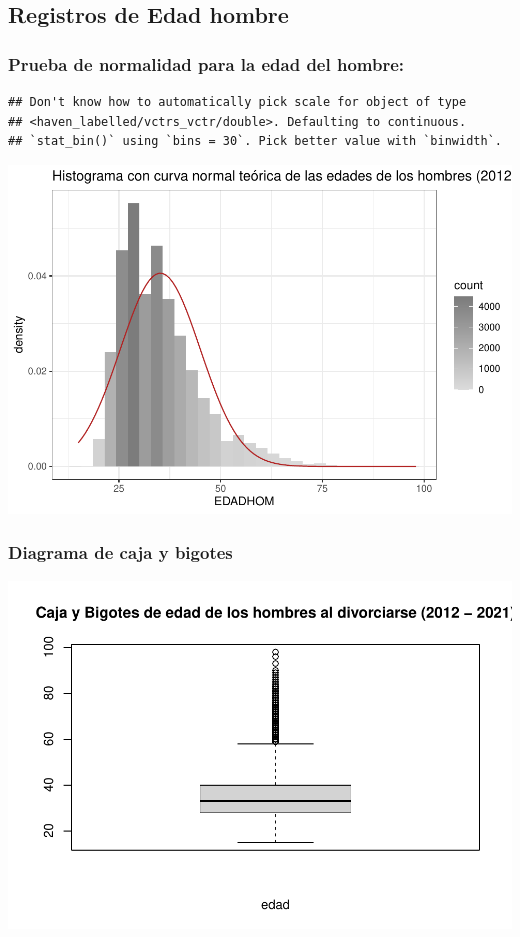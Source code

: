 \documentclass[
]{article}
\begin{document}
\hypertarget{registros-de-edad-hombre}{%
\subsection{Registros de Edad hombre}\label{registros-de-edad-hombre}}

\hypertarget{prueba-de-normalidad-para-la-edad-del-hombre}{%
\subsubsection{Prueba de normalidad para la edad del
hombre:}\label{prueba-de-normalidad-para-la-edad-del-hombre}}

\begin{verbatim}
## Don't know how to automatically pick scale for object of type
## <haven_labelled/vctrs_vctr/double>. Defaulting to continuous.
## `stat_bin()` using `bins = 30`. Pick better value with `binwidth`.
\end{verbatim}

\includegraphics{Proyecto_files/figure-latex/normalHistEdadHombre-1.pdf}

\hypertarget{diagrama-de-caja-y-bigotes}{%
\subsubsection{Diagrama de caja y
bigotes}\label{diagrama-de-caja-y-bigotes}}

\includegraphics{Proyecto_files/figure-latex/normalBoxEdadHombre-1.pdf}
\end{document}
